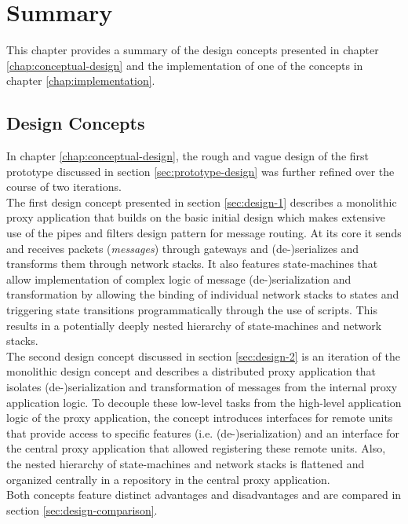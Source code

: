\chapter{Summary}
\label{chap:summary}
This chapter provides a summary of the design concepts presented in chapter \ref{chap:conceptual-design} and the implementation of one of the concepts in chapter \ref{chap:implementation}.

\section{Design Concepts}
\label{sec:summary-concept}
In chapter \ref{chap:conceptual-design}, the rough and vague design of the first prototype discussed in section \ref{sec:prototype-design} was further refined over the course of two iterations.\\
The first design concept presented in section \ref{sec:design-1} describes a monolithic proxy application that builds on the basic initial design which makes extensive use of the pipes and filters design pattern for message routing. At its core it sends and receives packets (\emph{messages}) through gateways and (de-)serializes and transforms them through network stacks. It also features state-machines that allow implementation of complex logic of message (de-)serialization and transformation by allowing the binding of individual network stacks to states and triggering state transitions programmatically through the use of scripts. This results in a potentially deeply nested hierarchy of state-machines and network stacks.\\
The second design concept discussed in section \ref{sec:design-2} is an iteration of the monolithic design concept and describes a distributed proxy application that isolates (de-)serialization and transformation of messages from the internal proxy application logic. To decouple these low-level tasks from the high-level application logic of the proxy application, the concept introduces interfaces for remote units that provide access to specific features (i.e. (de-)serialization) and an interface for the central proxy application that allowed registering these remote units. Also, the nested hierarchy of state-machines and network stacks is flattened and organized centrally in a repository in the central proxy application.\\
Both concepts feature distinct advantages and disadvantages and are compared in section \ref{sec:design-comparison}.

